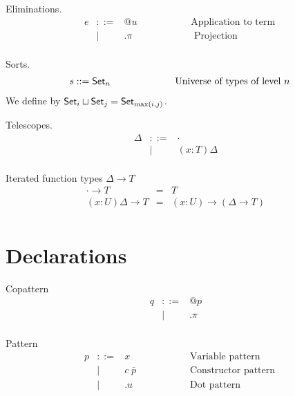 \documentclass[acmlarge]{acmart}\settopmatter{}
\renewcommand{\|}{\mid}
\begin{document}
Eliminations.
\[\begin{array}{lrll}
e &::=& @u                & \hspace{2cm}\text{Application to term} \\
    &|& .\pi               & \hspace{2cm}\text{ Projection} \\
\end{array} \]

Sorts.
\[\begin{array}{lrll}
s ::= \mathsf{Set}_n             & \hspace{2cm} \text{Universe of types of level $n$} \\
\end{array} \]
We define  by $\mathsf{Set}_i \sqcup \mathsf{Set}_j = \mathsf{Set}_{\max(i,j)}$.

Telescopes.
\[\begin{array}{lrll}
\Delta &::=& ·  & \\
      &  |& (x : T)\Delta & \\
\end{array} \]

Iterated function types $\Delta \rightarrow T$
\[\begin{array}{lrll}
· \rightarrow T &=& T &\\
(x : U)\Delta \rightarrow T &=& (x : U) \rightarrow (\Delta \rightarrow T) & \\
\end{array} \]


\section{Declarations}
\label{sec:declarations}

Copattern
\[\begin{array}{lrll}
q &::=& @p &\\
  &  |& .\pi \\
\end{array} \]

Pattern
\[\begin{array}{lrll}
p &::=& x     &  \hspace{2cm} \text{Variable pattern} \\
    &|& c\; \bar{p}    &  \hspace{2cm} \text{Constructor pattern} \\
    &|& .u      &  \hspace{2cm} \text{Dot pattern} \\
\end{array} \]
\end{document}

